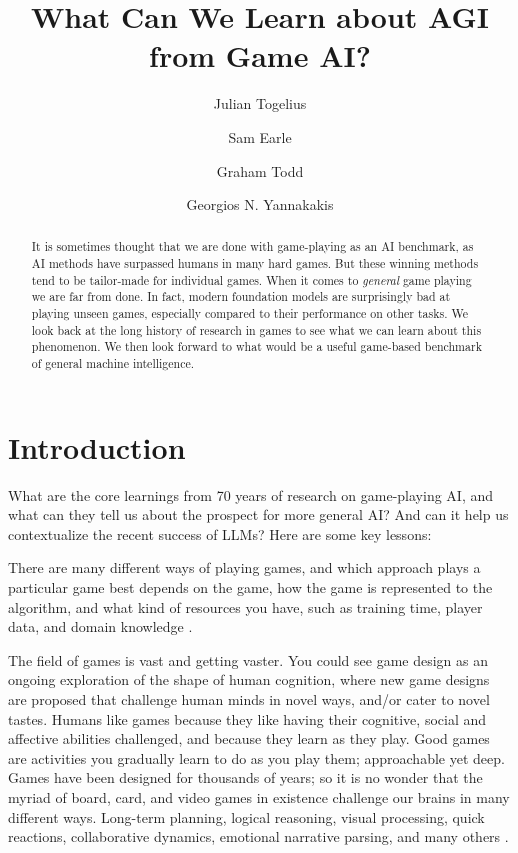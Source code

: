 \documentclass[runningheads]{llncs}
\begin{document}
\title{What Can We Learn about AGI from Game AI?}

\author{Julian Togelius \and
Sam Earle \and
Graham Todd \and
Georgios N. Yannakakis}


\maketitle

\begin{abstract}
It is sometimes thought that we are done with game-playing as an AI benchmark, as AI methods have surpassed humans in many hard games. But these winning methods tend to be tailor-made for individual games. When it comes to \emph{general} game playing we are far from done. In fact, modern foundation models are surprisingly bad at playing unseen games, especially compared to their performance on other tasks. We look back at the long history of research in games to see what we can learn about this phenomenon. We then look forward to what would be a useful game-based benchmark of general machine intelligence.

\end{abstract}

\section{Introduction}

What are the core learnings from 70 years of research on game-playing AI, and what can they tell us about the prospect for more general AI? And can it help us contextualize the recent success of LLMs? Here are some key lessons:

There are many different ways of playing games, and which approach plays a particular game best depends on the game, how the game is represented to the algorithm, and what kind of resources you have, such as training time, player data, and domain knowledge \cite{yannakakis2025artificial}.

The field of games is vast and getting vaster. You could see game design as an ongoing exploration of the shape of human cognition, where new game designs are proposed that challenge human minds in novel ways, and/or cater to novel tastes. Humans like games because they like having their cognitive, social and affective abilities challenged, and because they learn as they play. Good games are activities you gradually learn to do as you play them; approachable yet deep. Games have been designed for thousands of years; so it is no wonder that the myriad of board, card, and video games in existence challenge our brains in many different ways. Long-term planning, logical reasoning, visual processing, quick reactions, collaborative dynamics, emotional narrative parsing, and many others \cite{togelius2019playing}.
\end{document}
